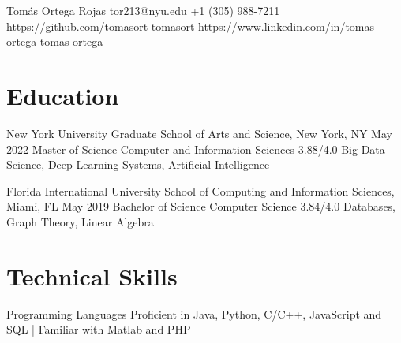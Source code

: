\documentclass[letterpaper,10pt]{article}
\begin{document}
\head
  {}
  {Tomás Ortega Rojas}
  {tor213@nyu.edu}  %
  {+1 (305) 988-7211}
  {https://github.com/tomasort}
  {tomasort}
  {https://www.linkedin.com/in/tomas-ortega}
  {tomas-ortega}


\section{Education}
\sectionStart
  \educationItem
    {New York University}
    {Graduate School of Arts and Science, New York, NY} 
    {May 2022}
    {Master of Science} 
    {Computer and Information Sciences} 
    {3.88/4.0}
    {
      Big Data Science, 
      Deep Learning Systems, 
      Artificial Intelligence
      }

  \educationItem
    {Florida International University}
    {School of Computing and Information Sciences, Miami, FL} 
    {May 2019}
    {Bachelor of Science} 
    {Computer Science} 
    {3.84/4.0}
    {
      Databases, 
      Graph Theory, 
      Linear Algebra
    }
\sectionEnd

\section{Technical Skills}
\sectionStart

  \skillItem
    {Programming Languages}
    {Proficient in Java, Python, C/C++, JavaScript and SQL |
      Familiar with Matlab and PHP}
\end{document}
